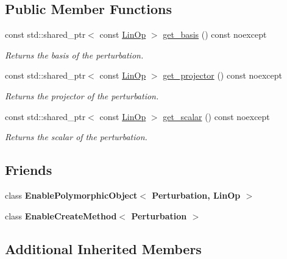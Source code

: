 \subsection*{Public Member Functions}
\begin{DoxyCompactItemize}
\item 
const std\+::shared\+\_\+ptr$<$ const \hyperlink{classgko_1_1LinOp}{Lin\+Op} $>$ \hyperlink{classgko_1_1Perturbation_a4080d4c1ea5529e5eb51eea5f85946bb}{get\+\_\+basis} () const noexcept
\begin{DoxyCompactList}\small\item\em Returns the basis of the perturbation. \end{DoxyCompactList}\item 
const std\+::shared\+\_\+ptr$<$ const \hyperlink{classgko_1_1LinOp}{Lin\+Op} $>$ \hyperlink{classgko_1_1Perturbation_a000aeeb35938fef6923673de3b932234}{get\+\_\+projector} () const noexcept
\begin{DoxyCompactList}\small\item\em Returns the projector of the perturbation. \end{DoxyCompactList}\item 
const std\+::shared\+\_\+ptr$<$ const \hyperlink{classgko_1_1LinOp}{Lin\+Op} $>$ \hyperlink{classgko_1_1Perturbation_af3a1d57c22b34f276a9222eb248825ae}{get\+\_\+scalar} () const noexcept
\begin{DoxyCompactList}\small\item\em Returns the scalar of the perturbation. \end{DoxyCompactList}\end{DoxyCompactItemize}
\subsection*{Friends}
\begin{DoxyCompactItemize}
\item 
\mbox{\label{classgko_1_1Perturbation_a7e9386180dd5369d21b42afab1c27562}} 
class {\bfseries Enable\+Polymorphic\+Object$<$ Perturbation, Lin\+Op $>$}
\item 
\mbox{\label{classgko_1_1Perturbation_a13fd7967428770aca8d7f67ac2397215}} 
class {\bfseries Enable\+Create\+Method$<$ Perturbation $>$}
\end{DoxyCompactItemize}
\subsection*{Additional Inherited Members}


